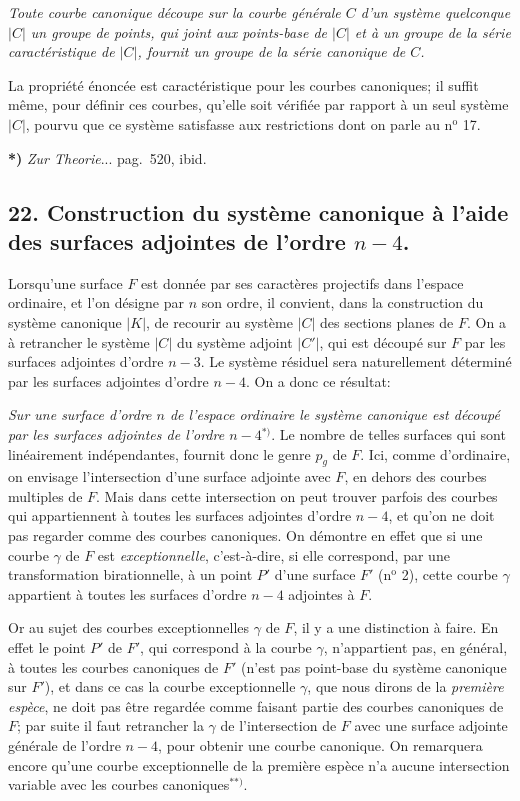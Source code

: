 \documentclass{article}
\begin{document}
\emph{Toute courbe canonique découpe sur la courbe générale $C$ d'un système quelconque $|C|$ un groupe de points, qui joint aux points-base de $|C|$ et à un groupe de la série caractéristique de $|C|$, fournit un groupe de la série canonique de $C$.}

La propriété énoncée est caractéristique pour les courbes canoniques; il suffit même, pour définir ces courbes, qu'elle soit vérifiée par rapport à un seul système $|C|$, pourvu que ce système satisfasse aux restrictions dont on parle au n${}^{\text{o}}$ 17.

\textbf{*)} \emph{Zur Theorie}... pag.\ 520, ibid.


\subsection*{22. Construction du système canonique à l'aide des surfaces adjointes de l'ordre $n-4$.}

Lorsqu'une surface $F$ est donnée par ses caractères projectifs dans l'espace ordinaire, et l'on désigne par $n$ son ordre, il convient, dans la construction du système canonique $|K|$, de recourir au système $|C|$ des sections planes de $F$. On a à retrancher le système $|C|$ du système adjoint $|C'|$, qui est découpé sur $F$ par les surfaces adjointes d'ordre $n-3$. Le système résiduel sera naturellement déterminé par les surfaces adjointes d'ordre $n-4$. On a donc ce résultat:

\emph{Sur une surface d'ordre $n$ de l'espace ordinaire le système canonique est découpé par les surfaces adjointes de l'ordre $n-4$}${}^{*)}$. Le nombre de telles surfaces qui sont linéairement indépendantes, fournit donc le genre $p_{g}$ de $F$. Ici, comme d'ordinaire, on envisage l'intersection d'une surface adjointe avec $F$, en dehors des courbes multiples de $F$. Mais dans cette intersection on peut trouver parfois des courbes qui appartiennent à toutes les surfaces adjointes d'ordre $n-4$, et qu'on ne doit pas regarder comme des courbes canoniques. On démontre en effet que si une courbe $\gamma$ de $F$ est \emph{exceptionnelle}, c'est-à-dire, si elle correspond, par une transformation birationnelle, à un point $P'$ d'une surface $F'$ (n${}^{\text{o}}$ 2), cette courbe $\gamma$ appartient à toutes les surfaces d'ordre $n-4$ adjointes à $F$.

Or au sujet des courbes exceptionnelles $\gamma$ de $F$, il y a une distinction à faire. En effet le point $P'$ de $F'$, qui correspond à la courbe $\gamma$, n'appartient pas, en général, à toutes les courbes canoniques de $F'$ (n'est pas point-base du système canonique sur $F'$), et dans ce cas la courbe exceptionnelle $\gamma$, que nous dirons de la \emph{première espèce}, ne doit pas être regardée comme faisant partie des courbes canoniques de $F$; par suite il faut retrancher la $\gamma$ de l'intersection de $F$ avec une surface adjointe générale de l'ordre $n-4$, pour obtenir une courbe canonique. On remarquera encore qu'une courbe exceptionnelle de la première espèce n'a aucune intersection variable avec les courbes canoniques${}^{**)}$.
\end{document}
